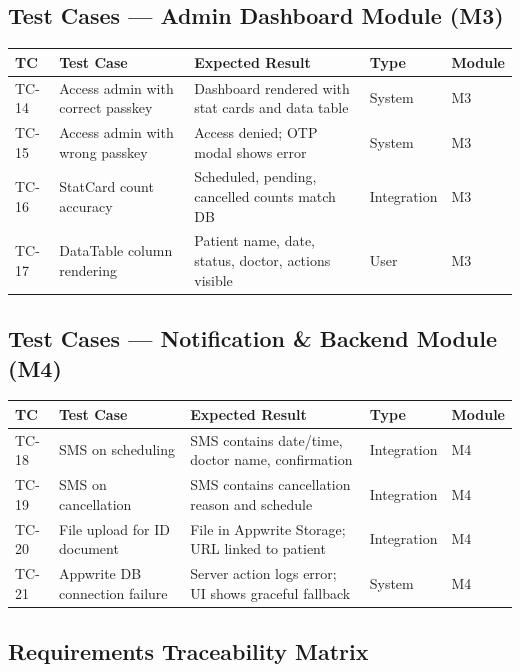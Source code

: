 \documentclass[11pt,a4paper]{article}
\begin{document}
\subsection{Test Cases --- Admin Dashboard Module (M3)}

\begin{longtable}{|p{1cm}|p{3.2cm}|p{4.2cm}|p{2.2cm}|p{1.5cm}|}
\hline
\textbf{TC} & \textbf{Test Case} & \textbf{Expected Result} & \textbf{Type} & \textbf{Module} \\
\hline
TC-14 & Access admin with correct passkey & Dashboard rendered with stat cards and data table & System & M3 \\
\hline
TC-15 & Access admin with wrong passkey & Access denied; OTP modal shows error & System & M3 \\
\hline
TC-16 & StatCard count accuracy & Scheduled, pending, cancelled counts match DB & Integration & M3 \\
\hline
TC-17 & DataTable column rendering & Patient name, date, status, doctor, actions visible & User & M3 \\
\hline
\end{longtable}

\subsection{Test Cases --- Notification \& Backend Module (M4)}

\begin{longtable}{|p{1cm}|p{3.2cm}|p{4.2cm}|p{2.2cm}|p{1.5cm}|}
\hline
\textbf{TC} & \textbf{Test Case} & \textbf{Expected Result} & \textbf{Type} & \textbf{Module} \\
\hline
TC-18 & SMS on scheduling & SMS contains date/time, doctor name, confirmation & Integration & M4 \\
\hline
TC-19 & SMS on cancellation & SMS contains cancellation reason and schedule & Integration & M4 \\
\hline
TC-20 & File upload for ID document & File in Appwrite Storage; URL linked to patient & Integration & M4 \\
\hline
TC-21 & Appwrite DB connection failure & Server action logs error; UI shows graceful fallback & System & M4 \\
\hline
\end{longtable}

\subsection{Requirements Traceability Matrix}
\end{document}
